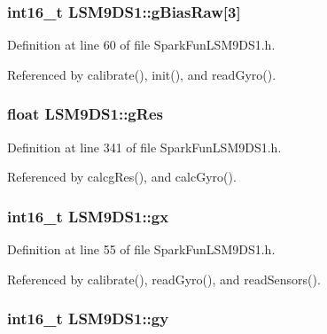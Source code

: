 \subsubsection[{\texorpdfstring{g\+Bias\+Raw}{gBiasRaw}}]{\setlength{\rightskip}{0pt plus 5cm}int16\+\_\+t L\+S\+M9\+D\+S1\+::g\+Bias\+Raw\mbox{[}3\mbox{]}}\hypertarget{class_l_s_m9_d_s1_ab2e59e0460cf88a12765238506031f2a}{}\label{class_l_s_m9_d_s1_ab2e59e0460cf88a12765238506031f2a}


Definition at line 60 of file Spark\+Fun\+L\+S\+M9\+D\+S1.\+h.



Referenced by calibrate(), init(), and read\+Gyro().

\subsubsection[{\texorpdfstring{g\+Res}{gRes}}]{\setlength{\rightskip}{0pt plus 5cm}float L\+S\+M9\+D\+S1\+::g\+Res\hspace{0.3cm}{\ttfamily [protected]}}\hypertarget{class_l_s_m9_d_s1_a2d8654ebb35177088a67e67a944bd998}{}\label{class_l_s_m9_d_s1_a2d8654ebb35177088a67e67a944bd998}


Definition at line 341 of file Spark\+Fun\+L\+S\+M9\+D\+S1.\+h.



Referenced by calcg\+Res(), and calc\+Gyro().

\subsubsection[{\texorpdfstring{gx}{gx}}]{\setlength{\rightskip}{0pt plus 5cm}int16\+\_\+t L\+S\+M9\+D\+S1\+::gx}\hypertarget{class_l_s_m9_d_s1_abf02b4544b5d529036adbac02e7b9f02}{}\label{class_l_s_m9_d_s1_abf02b4544b5d529036adbac02e7b9f02}


Definition at line 55 of file Spark\+Fun\+L\+S\+M9\+D\+S1.\+h.



Referenced by calibrate(), read\+Gyro(), and read\+Sensors().

\subsubsection[{\texorpdfstring{gy}{gy}}]{\setlength{\rightskip}{0pt plus 5cm}int16\+\_\+t L\+S\+M9\+D\+S1\+::gy}\hypertarget{class_l_s_m9_d_s1_a0c351823fd094ff24ff245dd951cf783}{}\label{class_l_s_m9_d_s1_a0c351823fd094ff24ff245dd951cf783}


